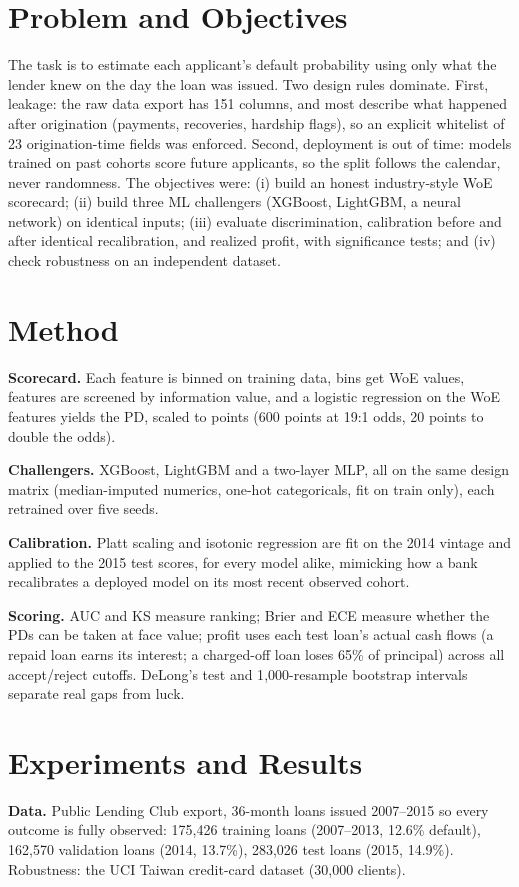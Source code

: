 \documentclass[a4paper,twocolumn,10pt]{article}
\begin{document}
\section{Problem and Objectives}
The task is to estimate each applicant's default probability using only what the lender knew on the day the loan was issued. Two design rules dominate. First, leakage: the raw data export has 151 columns, and most describe what happened after origination (payments, recoveries, hardship flags), so an explicit whitelist of 23 origination-time fields was enforced. Second, deployment is out of time: models trained on past cohorts score future applicants, so the split follows the calendar, never randomness. The objectives were: (i) build an honest industry-style WoE scorecard; (ii) build three ML challengers (XGBoost, LightGBM, a neural network) on identical inputs; (iii) evaluate discrimination, calibration before and after identical recalibration, and realized profit, with significance tests; and (iv) check robustness on an independent dataset.

\section{Method}
\textbf{Scorecard.} Each feature is binned on training data, bins get WoE values, features are screened by information value, and a logistic regression on the WoE features yields the PD, scaled to points (600 points at 19:1 odds, 20 points to double the odds).

\textbf{Challengers.} XGBoost, LightGBM and a two-layer MLP, all on the same design matrix (median-imputed numerics, one-hot categoricals, fit on train only), each retrained over five seeds.

\textbf{Calibration.} Platt scaling and isotonic regression are fit on the 2014 vintage and applied to the 2015 test scores, for every model alike, mimicking how a bank recalibrates a deployed model on its most recent observed cohort.

\textbf{Scoring.} AUC and KS measure ranking; Brier and ECE measure whether the PDs can be taken at face value; profit uses each test loan's actual cash flows (a repaid loan earns its interest; a charged-off loan loses 65\% of principal) across all accept/reject cutoffs. DeLong's test and 1{,}000-resample bootstrap intervals separate real gaps from luck.

\section{Experiments and Results}
\textbf{Data.} Public Lending Club export, 36-month loans issued 2007--2015 so every outcome is fully observed: 175{,}426 training loans (2007--2013, 12.6\% default), 162{,}570 validation loans (2014, 13.7\%), 283{,}026 test loans (2015, 14.9\%). Robustness: the UCI Taiwan credit-card dataset (30{,}000 clients).
\end{document}
